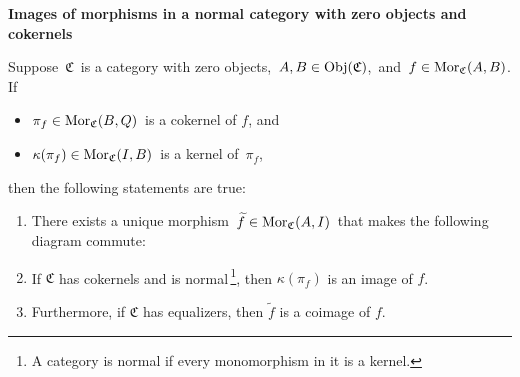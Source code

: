 
\vskip 1.0cm
\noindent
\textbf{\large Images of morphisms in a normal category with zero objects and cokernels}


\vskip 0.5cm
\begin{proposition}
\mbox{}
\vskip 0.1cm
\noindent
Suppose \,$\mathfrak{C}$\, is a category with zero objects,
\,$A, B \in \textnormal{Obj}(\mathfrak{C})$,\, and
\,$f \in \textnormal{Mor}_{\mathfrak{C}}(A,B)$.
If
\begin{itemize}
\item
	$\pi_{f} \in \textnormal{Mor}_{\mathfrak{C}}(B,Q)$\, is a cokernel of $f$, and
\item
	$\kappa(\pi_{f}) \in \textnormal{Mor}_{\mathfrak{C}}(I,B)$\, is a kernel of \,$\pi_{f}$,
\end{itemize}
then the following statements are true:
\begin{enumerate}
\item
	There exists a unique morphism \,$\widetilde{f} \in \textnormal{Mor}_{\mathfrak{C}}(A,I)$\,
	that makes the following diagram commute: %
	\begin{center}
	\end{center}
\item
	If $\mathfrak{C}$ has cokernels and
	is normal\,\footnote{A category is normal if every monomorphism in it is a kernel.},
	then $\kappa(\pi_{f})$ is an image of $f$.
\item
	Furthermore, if $\mathfrak{C}$ has equalizers, then $\widetilde{f}$ is a coimage of $f$.
\end{enumerate}
\end{proposition}
\proof
